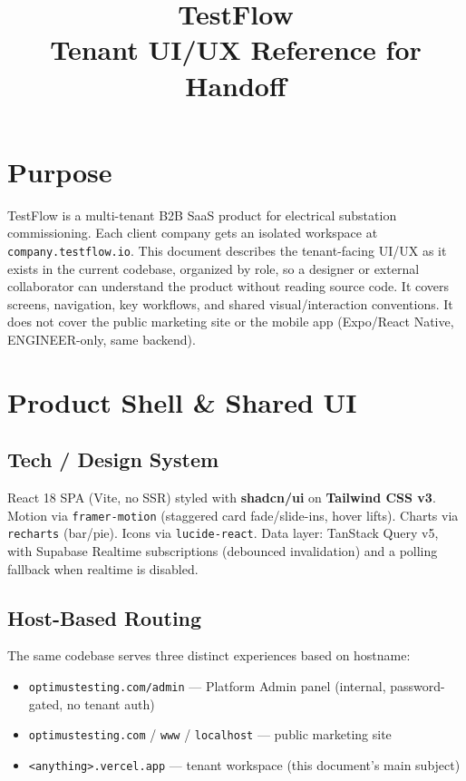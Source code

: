 \documentclass[11pt]{article}
\title{\color{tfblue}TestFlow \\ \large Tenant UI/UX Reference for Handoff}
\author{}
\date{}
\newcommand{\route}[1]{\texttt{#1}}
\begin{document}
\maketitle
\thispagestyle{fancy}

\section*{Purpose}
TestFlow is a multi-tenant B2B SaaS product for electrical substation commissioning. Each client
company gets an isolated workspace at \route{company.testflow.io}. This document describes the
tenant-facing UI/UX as it exists in the current codebase, organized by role, so a designer or
external collaborator can understand the product without reading source code. It covers screens,
navigation, key workflows, and shared visual/interaction conventions. It does not cover the public
marketing site or the mobile app (Expo/React Native, ENGINEER-only, same backend).

\section{Product Shell \& Shared UI}

\subsection{Tech / Design System}
React 18 SPA (Vite, no SSR) styled with \textbf{shadcn/ui} on \textbf{Tailwind CSS v3}. Motion via
\texttt{framer-motion} (staggered card fade/slide-ins, hover lifts). Charts via \texttt{recharts}
(bar/pie). Icons via \texttt{lucide-react}. Data layer: TanStack Query v5, with Supabase Realtime
subscriptions (debounced invalidation) and a polling fallback when realtime is disabled.

\subsection{Host-Based Routing}
The same codebase serves three distinct experiences based on hostname:
\begin{itemize}[nosep]
  \item \texttt{optimustesting.com/admin} --- Platform Admin panel (internal, password-gated, no tenant auth)
  \item \texttt{optimustesting.com} / \texttt{www} / \texttt{localhost} --- public marketing site
  \item \texttt{<anything>.vercel.app} --- tenant workspace (this document's main subject)
\end{itemize}
\end{document}
